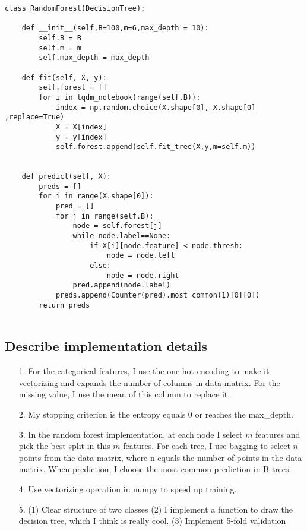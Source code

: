 \documentclass[a4paper,12pt]{article}
\begin{document}
\begin{lstlisting}
class RandomForest(DecisionTree):
    
    def __init__(self,B=100,m=6,max_depth = 10):
        self.B = B
        self.m = m
        self.max_depth = max_depth

    def fit(self, X, y):
        self.forest = []
        for i in tqdm_notebook(range(self.B)):
            index = np.random.choice(X.shape[0], X.shape[0] ,replace=True)
            X = X[index]
            y = y[index]
            self.forest.append(self.fit_tree(X,y,m=self.m))

    
    def predict(self, X):
        preds = []
        for i in range(X.shape[0]):
            pred = []
            for j in range(self.B):
                node = self.forest[j]
                while node.label==None:
                    if X[i][node.feature] < node.thresh:
                        node = node.left
                    else:
                        node = node.right
                pred.append(node.label)
            preds.append(Counter(pred).most_common(1)[0][0])
        return preds
        
\end{lstlisting}
\clearpage

\subsection{Describe implementation details}

\begin{itemize}
\item[1.] For the categorical features, I use the one-hot encoding to make it vectorizing and expands the number of columns in data matrix. For the missing value, I use the mean of this column to replace it.

\item[2.] My stopping criterion is the entropy equals 0 or reaches the max\_depth.

\item[3.] In the random forest implementation, at each node I select $m$ features and pick the best split in this $m$ features. For each tree, I use bagging to select $n$ points from the data matrix, where n equals the number of points in the data matrix. When prediction, I choose the most common prediction in B trees.

\item[4.] Use vectorizing operation in numpy to speed up training.

\item[5.] 
\subitem (1) Clear structure of two classes
\subitem (2) I implement a function to draw the decision tree, which I think is really cool. 
\subitem (3) Implement 5-fold validation
\end{itemize}
\clearpage
\end{document}
